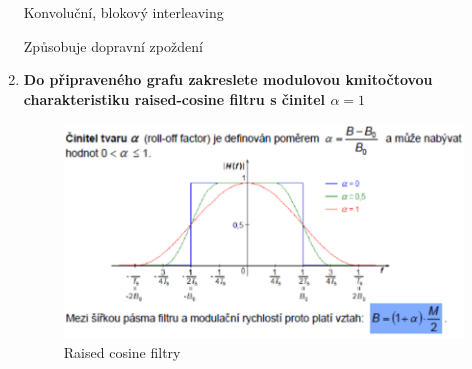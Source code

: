 \begin{enumerate}
    Konvoluční, blokový interleaving

    Způsobuje dopravní zpoždení

    \item \textbf{Do připraveného grafu zakreslete modulovou kmitočtovou charakteristiku raised-cosine filtru s činitel $\alpha=1$}
    \begin{figure}[h!]
        \centering
        \includegraphics[scale=0.3]{images/NyquistFilter.png}
        \caption{Raised cosine filtry}
        \label{fig:enter-label}
    \end{figure}
\end{enumerate}

